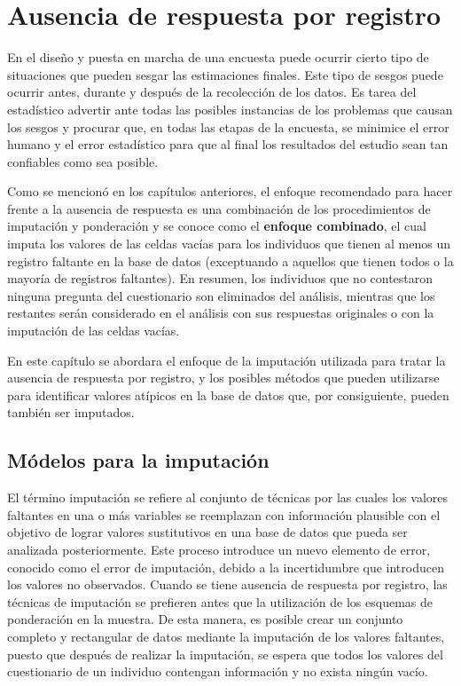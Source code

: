 \documentclass[
  10pt,
  spanish,
]{book}
\begin{document}
\hypertarget{ausencia-de-respuesta-por-registro}{%
\chapter{Ausencia de respuesta por registro}\label{ausencia-de-respuesta-por-registro}}

En el diseño y puesta en marcha de una encuesta puede ocurrir cierto tipo de situaciones que pueden sesgar las estimaciones finales. Este tipo de sesgos puede ocurrir antes, durante y después de la recolección de los datos. Es tarea del estadístico advertir ante todas las posibles instancias de los problemas que causan los sesgos y procurar que, en todas las etapas de la encuesta, se minimice el error humano y el error estadístico para que al final los resultados del estudio sean tan confiables como sea posible.

Como se mencionó en los capítulos anteriores, el enfoque recomendado para hacer frente a la ausencia de respuesta es una combinación de los procedimientos de imputación y ponderación y se conoce como el \textbf{enfoque combinado}, el cual imputa los valores de las celdas vacías para los individuos que tienen al menos un registro faltante en la base de datos (exceptuando a aquellos que tienen todos o la mayoría de registros faltantes). En resumen, los individuos que no contestaron ninguna pregunta del cuestionario son eliminados del análisis, mientras que los restantes serán considerado en el análisis con sus respuestas originales o con la imputación de las celdas vacías.

En este capítulo se abordara el enfoque de la imputación utilizada para tratar la ausencia de respuesta por registro, y los posibles métodos que pueden utilizarse para identificar valores atípicos en la base de datos que, por consiguiente, pueden también ser imputados.

\hypertarget{muxf3delos-para-la-imputaciuxf3n}{%
\section{Módelos para la imputación}\label{muxf3delos-para-la-imputaciuxf3n}}

El término imputación se refiere al conjunto de técnicas por las cuales los valores faltantes en una o más variables se reemplazan con información plausible con el objetivo de lograr valores sustitutivos en una base de datos que pueda ser analizada posteriormente. Este proceso introduce un nuevo elemento de error, conocido como el error de imputación, debido a la incertidumbre que introducen los valores no observados. Cuando se tiene ausencia de respuesta por registro, las técnicas de imputación se prefieren antes que la utilización de los esquemas de ponderación en la muestra. De esta manera, es posible crear un conjunto completo y rectangular de datos mediante la imputación de los valores faltantes, puesto que después de realizar la imputación, se espera que todos los valores del cuestionario de un individuo contengan información y no exista ningún vacío.
\end{document}
